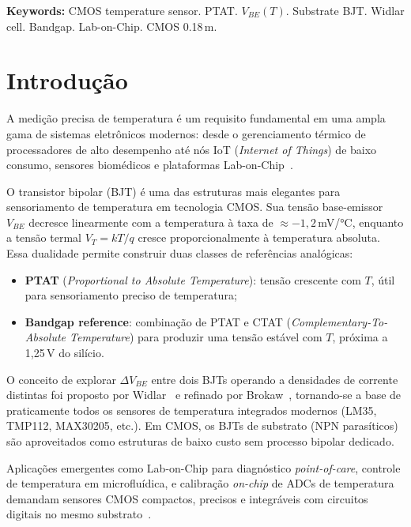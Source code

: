 \documentclass[12pt,a4paper]{article}
\begin{document}
\vspace{0.5cm}
\noindent\textbf{Keywords:} CMOS temperature sensor. PTAT. $V_{BE}(T)$. Substrate BJT.
Widlar cell. Bandgap. Lab-on-Chip. CMOS 0.18\,\textmu m.
\newpage

\tableofcontents\newpage
\listoffigures\newpage
\listoftables\newpage

\section{Introdução}

A medição precisa de temperatura é um requisito fundamental em uma ampla gama de sistemas
eletrônicos modernos: desde o gerenciamento térmico de processadores de alto desempenho
até nós IoT (\textit{Internet of Things}) de baixo consumo, sensores biomédicos e
plataformas Lab-on-Chip~\cite{bakker2000}.

O transistor bipolar (BJT) é uma das estruturas mais elegantes para sensoriamento de
temperatura em tecnologia CMOS. Sua tensão base-emissor $V_{BE}$ decresce linearmente
com a temperatura à taxa de $\approx -1{,}2$\,mV/°C, enquanto a tensão termal
$V_T = kT/q$ cresce proporcionalmente à temperatura absoluta. Essa dualidade permite
construir duas classes de referências analógicas:
\begin{itemize}
  \item \textbf{PTAT} (\textit{Proportional to Absolute Temperature}): tensão crescente com $T$,
        útil para sensoriamento preciso de temperatura;
  \item \textbf{Bandgap reference}: combinação de PTAT e CTAT (\textit{Complementary-To-Absolute
        Temperature}) para produzir uma tensão estável com $T$, próxima a 1,25\,V do silício.
\end{itemize}

O conceito de explorar $\Delta V_{BE}$ entre dois BJTs operando a densidades de corrente
distintas foi proposto por Widlar~\cite{widlar1971} e refinado por Brokaw~\cite{brokaw1974},
tornando-se a base de praticamente todos os sensores de temperatura integrados modernos
(LM35, TMP112, MAX30205, etc.). Em CMOS, os BJTs de substrato (NPN parasíticos) são
aproveitados como estruturas de baixo custo sem processo bipolar dedicado.

Aplicações emergentes como Lab-on-Chip para diagnóstico \textit{point-of-care}, controle
de temperatura em microfluídica, e calibração \textit{on-chip} de ADCs de temperatura
demandam sensores CMOS compactos, precisos e integráveis com circuitos digitais no mesmo
substrato~\cite{pertijs2006}.
\end{document}
